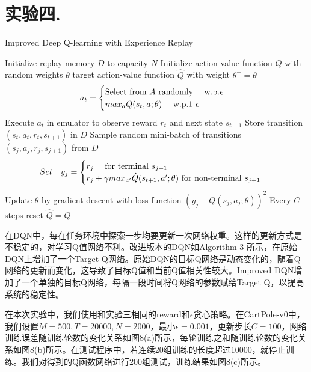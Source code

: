 \documentclass[a4paper,UTF8]{article}
\theoremstyle{definition}
\renewcommand{\algorithmicrequire}{\textbf{Input:}}
\renewcommand{\algorithmicensure}{\textbf{Procedure:}}
\begin{document}
\section*{实验四. }
	\begin{algorithm}[!h]
	\renewcommand{\algorithmicrequire}{\textbf{Input:}}
	\renewcommand{\algorithmicensure}{\textbf{Output:}}
	\caption{Improved Deep Q-learning with Experience Replay}
	\label{alg:3}
	\begin{algorithmic}[1]
		\STATE Initialize replay memory $D$ to capacity $N$
		\STATE Initialize action-value function $Q$ with random weights $\theta$
		\STATE target action-value function $\hat{Q}$ with weight $\theta^-=\theta$
			\STATE	$$a_t=
\begin{cases}
\text{Select from $A$ randomly \quad w.p.$\epsilon$}\\
\text{$max_a$$Q(s_t,a;\theta)$ \quad w.p.1-$\epsilon$ }
\end{cases}$$
\STATE Execute $a_t$ in emulator to observe reward $r_t$ and next state $s_{t+1}$
\STATE Store transition $(s_t,a_t,r_t,s_{t+1})$ in $D$
\STATE Sample random mini-batch of transitions $(s_j,a_j,r_j,s_{j+1})$ from $D$
\STATE	$$Set \quad y_j=
\begin{cases}
\text{$r_j$ \quad for terminal $s_{j+1}$}\\
\text{$r_j+\gamma max_{a'}\hat{Q}(s_{t+1},a';\theta)$ for non-terminal $s_{j+1}$ }
\end{cases}$$
\STATE Update $\theta$ by gradient descent with loss function $(y_j-Q(s_j,a_j;\theta))^2$
\STATE Every $C$ steps reset $\hat{Q}=Q$
			\ENDFOR
		\ENDFOR
\end{algorithmic}  
\end{algorithm}

	在DQN中，每在任务环境中探索一步均要更新一次网络权重。这样的更新方式是不稳定的，对学习Q值网络不利。改进版本的DQN如Algorithm 3 \cite{ref3}所示，在原始DQN上增加了一个Target Q网络。原始DQN的目标Q网络是动态变化的，随着Q网络的更新而变化，这导致了目标Q值和当前Q值相关性较大。Improved DQN增加了一个单独的目标Q网络，每隔一段时间将Q网络的参数赋给Target Q，以提高系统的稳定性。

	在本次实验中，我们使用和实验三相同的reward和$\epsilon$贪心策略。在CartPole-v0中，我们设置$M=500,T=20000,N=2000$，最小$\epsilon=0.001$，更新步长$C=100$，网络训练误差随训练轮数的变化关系如图8(a)所示，每轮训练之和随训练轮数的变化关系如图8(b)所示。在测试程序中，若连续20组训练的长度超过10000，就停止训练。我们对得到的Q函数网络进行200组测试，训练结果如图8(c)所示。
\end{document}
